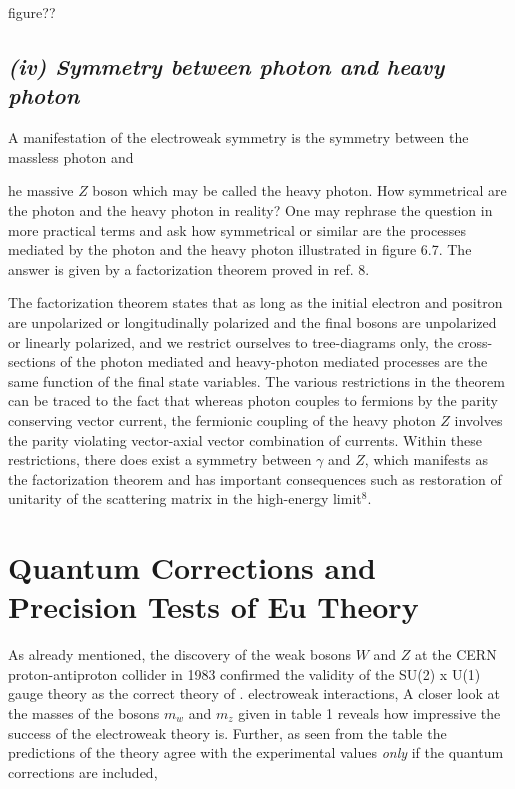 figure??

\subsection*{{\it (iv) Symmetry between photon and heavy photon}}

A manifestation of the electroweak symmetry is the symmetry between the massless photon and
{he massive $Z$ boson which may be called the heavy photon. How symmetrical are the photon and
the heavy photon in reality? One may rephrase the question in more practical terms and ask how
symmetrical or similar are the processes mediated by the photon and the heavy photon illustrated
in figure 6.7. The answer is given by a factorization theorem proved in ref. 8. 

The factorization theorem states that as long as the initial electron and positron are unpolarized or longitudinally polarized and the final bosons are unpolarized or linearly polarized, and we restrict ourselves to tree-diagrams only, the cross-sections of the photon mediated and heavy-photon mediated processes are the same function of the final state variables. The various restrictions in the theorem can be traced to the fact that whereas photon couples to fermions by the parity conserving vector current, the fermionic coupling of the heavy photon $Z$ involves the parity violating vector-axial
vector combination of currents. Within these restrictions, there does exist a symmetry between $\gamma$
and $Z$, which manifests as the factorization theorem and has important consequences such as
restoration of unitarity of the scattering matrix in the high-energy limit$^{8}$. 

\section{Quantum Corrections and Precision Tests of Eu Theory}

As already mentioned, the discovery of the weak bosons $W$ and $Z$ at the CERN proton-antiproton collider in 1983 confirmed the validity of the SU(2) x U(1) gauge theory as the correct theory of
. electroweak interactions, A closer look at the masses of the bosons $m_{w}$ and $m_{z}$ given in table 1
reveals how impressive the success of the electroweak theory is. Further, as seen from the table
the predictions of the theory agree with the experimental values {\it only} if the quantum corrections are included, 

\newpage

}
